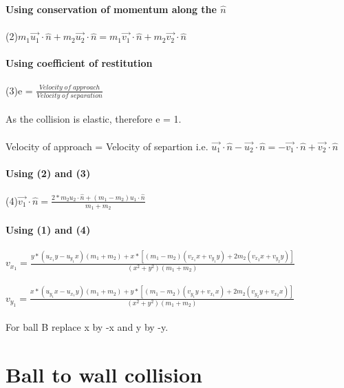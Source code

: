 \documentclass[a4paper,12pt]{report}
\begin{document}
\textbf{Using conservation of momentum along the $\hat{n}$}\\\\
(2)\hspace*{3cm}$m_{1}\vec{u_{1}}\cdot\hat{n}+m_{2}\vec{u_{2}}\cdot\hat{n} = m_{1}\vec{v_{1}}\cdot\hat{n}+m_{2}\vec{v_{2}}\cdot\hat{n}$\\\\
\textbf{Using coefficient of restitution}\\\\
(3)\hspace*{3cm}e = $\frac{Velocity \; of\; approach}{Velocity\; of\; separation}$\\\\
As the collision is elastic, therefore e = 1. \\\\ 
Velocity of approach = Velocity of separtion i.e.
$\vec{u_{1}}\cdot\hat{n}-\vec{u_{2}}\cdot\hat{n} = -\vec{v_{1}}\cdot\hat{n}+\vec{v_{2}}\cdot\hat{n}$\\\\
\textbf{Using (2) and (3)}\\\\
(4)\hspace*{3cm}$\vec{v_{1}}\cdot\hat{n} = \frac{2*m_{2}u_{2}\cdot\hat{n} + (m_{1}-m_{2})u_{1}\cdot\hat{n}}{m_{1}+m_{2}}$\\\\
\textbf{Using (1) and (4)}\\\\
$v_{x_{1}} = \frac{y*(u_{x_{1}}y-u_{y_{1}}x)(m_{1}+m_{2}) + x*[(m_{1}-m_{2})(v_{x_{1}}x+v_{y_{1}}y)+2m_{2}(v_{x_{2}}x+v_{y_{2}}y)]}{(x^{2}+y^{2})(m_{1}+m_{2})}$\\\\
$v_{y_{1}} = \frac{x*(u_{y_{1}}x-u_{x_{1}}y)(m_{1}+m_{2}) + y*[(m_{1}-m_{2})(v_{y_{1}}y+v_{x_{1}}x)+2m_{2}(v_{y_{2}}y+v_{x_{2}}x)]}{(x^{2}+y^{2})(m_{1}+m_{2})}$\\\\
For ball B replace x by -x and y by -y.\\

\section{Ball to wall collision}
\end{document}
